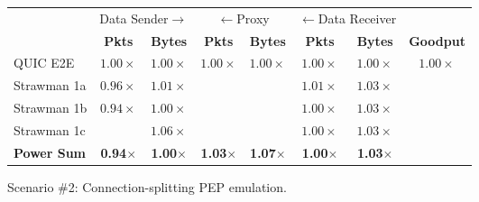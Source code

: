\begin{figure}[h]
\begin{subfigure}{\columnwidth}
  \setlength{\tabcolsep}{2pt}
  \footnotesize
  \centering
  \vspace{-0.25cm}
  \begin{tabular}{lccccccc}
    \toprule
    & \multicolumn{2}{c}{Data Sender$\rightarrow$} & \multicolumn{2}{c}{$\leftarrow$Proxy} & \multicolumn{2}{c}{$\leftarrow$Data Receiver} & \\
    & \bf Pkts & \bf Bytes & \bf Pkts & \bf Bytes & \bf Pkts & \bf Bytes & \bf Goodput \\
    \midrule
    QUIC E2E & $1.00\times$ & $1.00\times$ & $1.00\times$ & $1.00\times$ & $1.00\times$ & $1.00\times$ & $1.00\times$ \\
    Strawman 1a & $0.96\times$ & $1.01\times$ & \cellcolor{LighterRed}{$2.02\times$} & \cellcolor{LightestRed}{$1.56\times$} & $1.01\times$ & $1.03\times$ & \cellcolor{LighterGreen}{$3.33\times$} \\
    Strawman 1b & $0.94\times$ & $1.00\times$ & \cellcolor{LighterRed}{$2.00\times$} & \cellcolor{LightestRed}{$1.78\times$} & $1.00\times$ & $1.03\times$ & \cellcolor{LightGreen}{$3.53\times$} \\
    Strawman 1c & \cellcolor{LightestRed}{$1.83\times$} & $1.06\times$ & \cellcolor{LighterRed}{$2.01\times$} & \cellcolor{LightestRed}{$1.83\times$} & $1.00\times$ & $1.03\times$ & \cellcolor{LightGreen}{$3.46\times$} \\
    \bf \textcolor{black!50!blue}{Power Sum}   & \textcolor{black!50!blue}{\bf 0.94$\times$} & \textcolor{black!50!blue}{\bf 1.00$\times$} & \textcolor{black!50!blue}{\bf 1.03$\times$} & \textcolor{black!50!blue}{\bf 1.07$\times$} & \textcolor{black!50!blue}{\bf 1.00$\times$} & \textcolor{black!50!blue}{\bf 1.03$\times$} & \cellcolor{LightGreen}{\textcolor{black!50!blue}{\bf 3.55$\times$}} \\
    \bottomrule
  \end{tabular}
  \caption{Scenario \#2: Connection-splitting PEP emulation.}
  \label{tab:packet-overhead:retx}
\end{subfigure}
\begin{subfigure}{\columnwidth}

\end{subfigure}
\end{figure}
